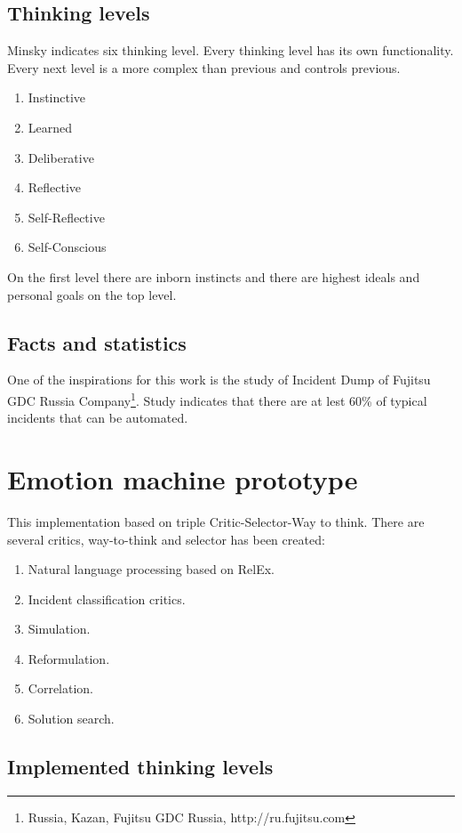 \documentclass[runningheads,a4paper]{llncs}
\begin{document}
\subsection{Thinking levels}

Minsky indicates six thinking level. Every thinking level has its own functionality. Every next level is a more complex than previous and controls previous.

\begin{enumerate}
 \item Instinctive
 \item Learned
 \item Deliberative
 \item Reflective
 \item Self-Reflective
 \item Self-Conscious
\end{enumerate}
On the first level there are inborn instincts and there are highest ideals and personal goals on the top level.

\subsection{Facts and statistics}
One of the inspirations for this work is the study of Incident Dump of Fujitsu GDC Russia  Company\footnote{Russia, Kazan, Fujitsu GDC Russia, http://ru.fujitsu.com}. Study indicates that there are at lest 60\% of typical incidents that can be automated.

\section{Emotion machine prototype}
This implementation based on triple Critic-Selector-Way to think. There are several critics, way-to-think and selector has been created:

\begin{enumerate}
 \item Natural language processing based on RelEx.
 \item Incident classification critics.
 \item Simulation.
 \item Reformulation.
 \item Correlation.
 \item Solution search.
\end{enumerate}

\subsection{Implemented thinking levels}
\end{document}
